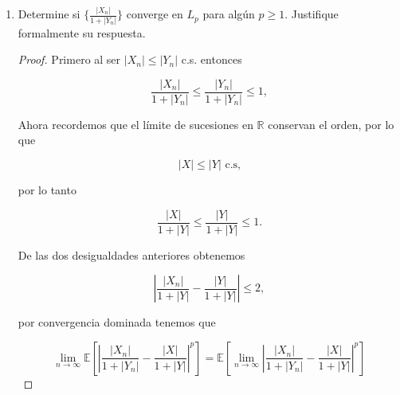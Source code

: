 \documentclass[letterpaper]{article}
\theoremstyle{definition}
\theoremstyle{lemathm}
\theoremstyle{lemademthm}
\newcommand{\limninf}{\lim_{n\to\infty}}
\newcommand{\abs}[1]{\left| #1 \right| }
\newcommand{\bracs}[1]{\left[ #1 \right] }
\newcommand{\R}{\mathbb{R}}
\newcommand{\1}{\mathbbm{1}}
\begin{document}
\begin{enumerate}
\begin{enumerate}
\begin{proof}
				también sus valores absolutos cumplen

				\[|X_{n_{k_{m_l}}}| \xrightarrow{c.s.} |X| \text{ y } |Y_{n_{k_{m_l}}}| \xrightarrow{c.s.} |Y|,\]

				Las siguientes operaciones se siguen de las propiedades del limite en los números reales. Por linealidad del operador límite tenemos

				\[1 + |Y_{n_{k_{m_l}}}| \xrightarrow{c.s.} 1 + |Y|,\]

				además al ser $0 < 1 + |Y_{n_{k_{m_l}}}|$ entonces su inverso cumple que

				\[\frac{1}{1 + |Y_{n_{k_{m_l}}}|} \xrightarrow{c.s.} \frac{1}{1 + |Y|},\]

				por último el el producto de ellos también converge c.s. es decir

				\[\frac{|X_{n_{k_{m_l}}}|}{1 + |Y_{n_{k_{m_l}}}|} \xrightarrow{c.s.} \frac{|X|}{1 + |Y|},\]

				por el Teorema 7.3 concluimos que
				
				\[\frac{|X_n|}{1+|Y_n|} \xrightarrow{P} \frac{|X|}{1+|Y|}\]

			\end{proof}

			\newpage
			
			\item Determine si $\big\{\frac{|X_n|}{1+|Y_n|}\big\}$ converge en $L_p$ para algún $p\geq 1$. Justifique formalmente su respuesta.
			
			\begin{proof}
				Primero al ser $|X_n| \leq |Y_n|$ c.s. entonces

				\[\frac{|X_n|}{1+|Y_n|} \leq \frac{|Y_n|}{1+|Y_n|} \leq 1,\]

				Ahora recordemos que el límite de sucesiones en $\R$ conservan el orden, por lo que

				\[|X| \leq |Y| \text{ c.s,}\]

				por lo tanto

				\[\frac{|X|}{1+|Y|} \leq \frac{|Y|}{1+|Y|} \leq 1.\]

				De las dos desigualdades anteriores obtenemos

				\[\abs{\frac{|X_n|}{1+|Y|} - \frac{|Y|}{1+|Y|}} \leq 2,\]

				por convergencia dominada tenemos que

				\[\limninf \mathbb{E}\bracs{\abs{\frac{|X_n|}{1+|Y_n|} - \frac{|X|}{1+|Y|}}^p} = \mathbb{E}\bracs{\limninf\abs{\frac{|X_n|}{1+|Y_n|} - \frac{|X|}{1+|Y|}}^p}\]


\end{proof}
\end{enumerate}
\end{enumerate}
\end{document}
